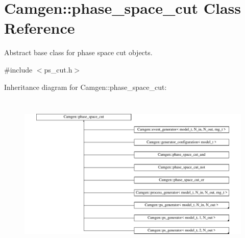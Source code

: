 \hypertarget{a00413}{\section{Camgen\-:\-:phase\-\_\-space\-\_\-cut Class Reference}
\label{a00413}
}


Abstract base class for phase space cut objects.  




{\ttfamily \#include $<$ps\-\_\-cut.\-h$>$}

Inheritance diagram for Camgen\-:\-:phase\-\_\-space\-\_\-cut\-:\begin{figure}[H]
\begin{center}
\leavevmode
\includegraphics[height=7.756233cm]{a00413}
\end{center}
\end{figure}
